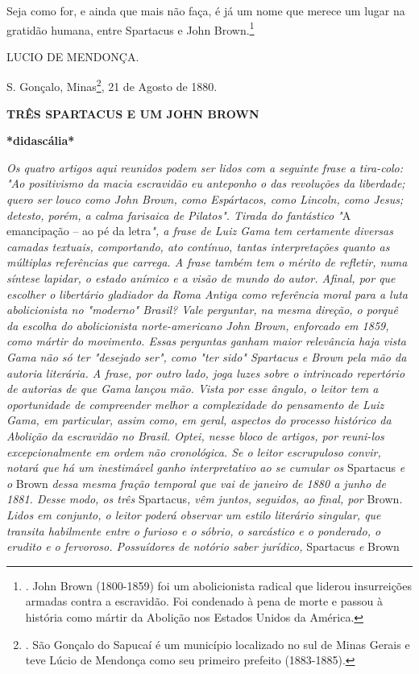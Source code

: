Seja como for, e ainda que mais não faça, é já um nome que merece um
lugar na gratidão humana, entre Spartacus e John Brown.\footnote{. John
  Brown (1800-1859) foi um abolicionista radical que liderou
  insurreições armadas contra a escravidão. Foi condenado à pena de
  morte e passou à história como mártir da Abolição nos Estados Unidos
  da América.}

LUCIO DE MENDONÇA.

S. Gonçalo, Minas\footnote{. São Gonçalo do Sapucaí é um município
  localizado no sul de Minas Gerais e teve Lúcio de Mendonça como seu
  primeiro prefeito (1883-1885).},
21 de Agosto de 1880.

\textbf{TRÊS SPARTACUS E UM
JOHN BROWN}

\textbf{*didascália*}

\emph{Os quatro artigos aqui reunidos podem ser lidos com a seguinte
frase a tira-colo: "Ao positivismo da macia escravidão eu anteponho o
das revoluções da liberdade; quero ser louco como John Brown, como
Espártacos, como Lincoln, como Jesus; detesto, porém, a calma farisaica
de Pilatos". Tirada do fantástico "}A emancipação -- ao pé da
letra\emph{", a frase de Luiz Gama tem certamente diversas camadas
textuais, comportando, ato contínuo, tantas interpretações quanto as
múltiplas referências que carrega. A frase também tem o mérito de
refletir, numa síntese lapidar, o estado anímico e a visão de mundo do
autor. Afinal, por que escolher o libertário gladiador da Roma Antiga
como referência moral para a luta abolicionista no "moderno" Brasil?
Vale perguntar, na mesma direção, o porquê da escolha do abolicionista
norte-americano John Brown, enforcado em 1859, como mártir do movimento.
Essas perguntas ganham maior relevância haja vista Gama não só ter
"desejado ser", como "ter sido" Spartacus e Brown pela mão da autoria
literária. A frase, por outro lado, joga luzes sobre o intrincado
repertório de autorias de que Gama lançou mão. Vista por esse ângulo, o
leitor tem a oportunidade de compreender melhor a complexidade do
pensamento de Luiz Gama, em particular, assim como, em geral, aspectos
do processo histórico da Abolição da escravidão no Brasil. Optei, nesse
bloco de artigos, por reuni-los excepcionalmente em ordem não
cronológica. Se o leitor escrupuloso convir, notará que há um
inestimável ganho interpretativo ao se cumular os} Spartacus \emph{e o}
Brown \emph{dessa mesma fração temporal que vai de janeiro de 1880 a
junho de 1881. Desse modo, os três} Spartacus\emph{, vêm juntos,
seguidos, ao final, por} Brown\emph{. Lidos em conjunto, o leitor poderá
observar um estilo literário singular, que transita habilmente entre o
furioso e o sóbrio, o sarcástico e o ponderado, o erudito e o fervoroso.
Possuídores de notório saber jurídico,} Spartacus \emph{e} Brown
